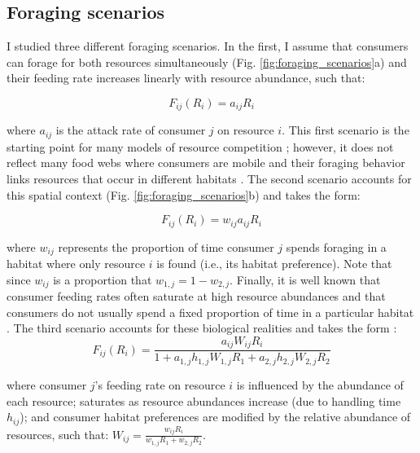 \documentclass[11pt,]{article}
\begin{document}
\subsection{Foraging scenarios}\label{foraging-scenarios}

I studied three different foraging scenarios. In the first, I assume
that consumers can forage for both resources simultaneously (Fig.
\ref{fig:foraging_scenarios}a) and their feeding rate increases linearly
with resource abundance, such that:

\begin{equation} \label{eq:2}
  F_{ij}(R_i)=a_{ij}R_i
\end{equation}

where \(a_{ij}\) is the attack rate of consumer \(j\) on resource \(i\).
This first scenario is the starting point for many models of resource
competition \citep{MacArthur1972}; however, it does not reflect many
food webs where consumers are mobile and their foraging behavior links
resources that occur in different habitats \citep{Holt1984}. The second
scenario accounts for this spatial context (Fig.
\ref{fig:foraging_scenarios}b) and takes the form:

\begin{equation} \label{eq:3}
  F_{ij}(R_i)=w_{ij}a_{ij}R_i
\end{equation}

where \(w_{ij}\) represents the proportion of time consumer \(j\) spends
foraging in a habitat where only resource \(i\) is found (i.e., its
habitat preference). Note that since \(w_{ij}\) is a proportion that
\(w_{1,j}=1-w_{2,j}\). Finally, it is well known that consumer feeding
rates often saturate at high resource abundances
\citep{Holling1959, Rosenzweig1963, Murdoch2003, McCann2011} and that
consumers do not usually spend a fixed proportion of time in a
particular habitat \citep{McCann2005}. The third scenario accounts for
these biological realities and takes the form \citep[derived
by][]{McCann2005}:\\

\begin{equation} \label{eq:4}
  F_{ij}(R_i)=\frac{a_{ij}W_{ij}R_i}{1+a_{1,j}h_{1,j}W_{1,j}R_1+a_{2,j}h_{2,j}W_{2,j}R_2}
\end{equation}

where consumer \(j\)'s feeding rate on resource \(i\) is influenced by
the abundance of each resource; saturates as resource abundances
increase (due to handling time \(h_{ij}\)); and consumer habitat
preferences are modified by the relative abundance of resources, such
that: \(W_{ij}=\frac{w_{ij}R_i}{w_{1,j}R_1+w_{2,j}R_2}\).
\end{document}
